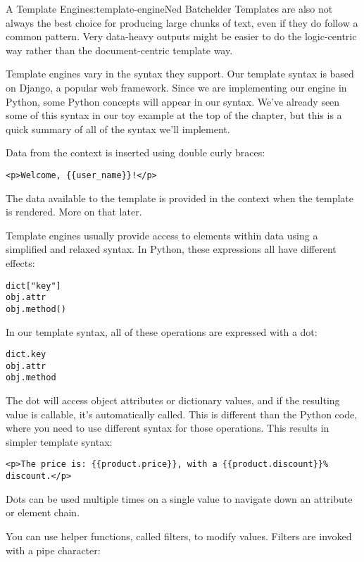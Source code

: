 \begin{aosachapter}{A Template Engine}{s:template-engine}{Ned Batchelder}
Templates are also not always the best choice for producing large chunks
of text, even if they do follow a common pattern. Very data-heavy
outputs might be easier to do the logic-centric way rather than the
document-centric template way.

\label{supported-syntax}

Template engines vary in the syntax they support. Our template syntax is
based on Django, a popular web framework. Since we are implementing our
engine in Python, some Python concepts will appear in our syntax. We've
already seen some of this syntax in our toy example at the top of the
chapter, but this is a quick summary of all of the syntax we'll
implement.

Data from the context is inserted using double curly braces:

\begin{verbatim}
<p>Welcome, {{user_name}}!</p>
\end{verbatim}

The data available to the template is provided in the context when the
template is rendered. More on that later.

Template engines usually provide access to elements within data using a
simplified and relaxed syntax. In Python, these expressions all have
different effects:

\begin{verbatim}
dict["key"]
obj.attr
obj.method()
\end{verbatim}

In our template syntax, all of these operations are expressed with a
dot:

\begin{verbatim}
dict.key
obj.attr
obj.method
\end{verbatim}

The dot will access object attributes or dictionary values, and if the
resulting value is callable, it's automatically called. This is
different than the Python code, where you need to use different syntax
for those operations. This results in simpler template syntax:

\begin{verbatim}
<p>The price is: {{product.price}}, with a {{product.discount}}% discount.</p>
\end{verbatim}

Dots can be used multiple times on a single value to navigate down an
attribute or element chain.

You can use helper functions, called filters, to modify values. Filters
are invoked with a pipe character:


\end{aosachapter}
